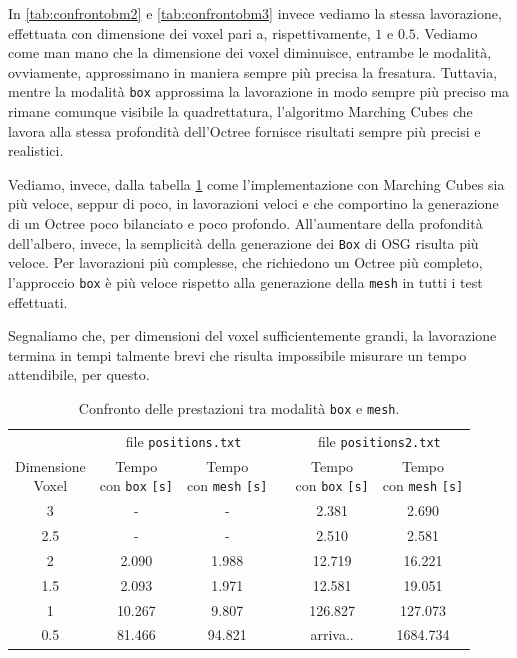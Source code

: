 In \ref{tab:confrontobm2} e \ref{tab:confrontobm3} invece vediamo la stessa lavorazione, effettuata con dimensione dei voxel pari a, rispettivamente, $1$ e $0.5$. Vediamo come man mano che la dimensione dei voxel diminuisce, entrambe le modalità, ovviamente, approssimano in maniera sempre più precisa la fresatura. Tuttavia, mentre la modalità \texttt{box} approssima la lavorazione in modo sempre più preciso ma rimane comunque visibile la quadrettatura, l'algoritmo Marching Cubes che lavora alla stessa profondità dell'Octree fornisce risultati sempre più precisi e realistici.

Vediamo, invece, dalla tabella \ref{tab:confrontoBoxMesh} come l'implementazione con Marching Cubes sia più veloce, seppur di poco, in lavorazioni veloci e che comportino la generazione di un Octree poco bilanciato e poco profondo. All'aumentare della profondità dell'albero, invece, la semplicità della generazione dei \texttt{Box} di OSG risulta più veloce. Per lavorazioni più complesse, che richiedono un Octree più completo, l'approccio \texttt{box} è più veloce rispetto alla generazione della \texttt{mesh} in tutti i test effettuati.

Segnaliamo che, per dimensioni del voxel sufficientemente grandi, la lavorazione termina in tempi talmente brevi che risulta impossibile misurare un tempo attendibile, per questo.

\begin{center}
  \begin{table}[h]
   \centering
      \begin{tabular}{cccccc}
        \toprule
        & \multicolumn{2}{c}{file \texttt{positions.txt}} & & \multicolumn{2}{c}{file \texttt{positions2.txt}}\\
        \cmidrule(r){2-3}\cmidrule(r){5-6}
          \shortstack{Dimensione\\ Voxel} & \shortstack{Tempo \\con \texttt{box} \texttt{[s]}} & \shortstack{Tempo \\con \texttt{mesh} \texttt{[s]}} & & \shortstack{Tempo \\con \texttt{box} \texttt{[s]}} & \shortstack{Tempo \\con \texttt{mesh} \texttt{[s]}}\\
        \midrule
          3   & -      & -      & & 2.381    & 2.690    \\
          2.5 & -      & -      & & 2.510    & 2.581    \\
          2   & 2.090  & 1.988  & & 12.719   & 16.221   \\
          1.5 & 2.093  & 1.971  & & 12.581   & 19.051   \\
          1   & 10.267 & 9.807  & & 126.827  & 127.073  \\
          0.5 & 81.466 & 94.821 & & arriva.. & 1684.734 \\
        \bottomrule
      \end{tabular}
      \caption{Confronto delle prestazioni tra modalità \texttt{box} e \texttt{mesh}.}
      \label{tab:confrontoBoxMesh}
  \end{table}
\end{center}

